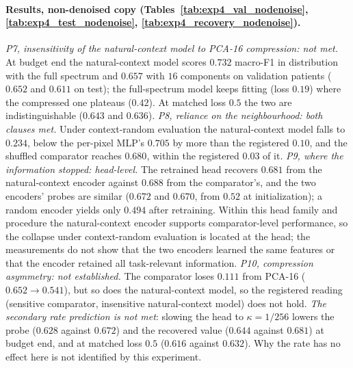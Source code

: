 \paragraph{Results, non-denoised copy (Tables~\ref{tab:exp4_val_nodenoise},
\ref{tab:exp4_test_nodenoise}, \ref{tab:exp4_recovery_nodenoise}).}
\emph{P7, insensitivity of the natural-context model to PCA-16 compression: not
met.} At budget end the natural-context model scores $0.732$ macro-F1 in distribution
with the full spectrum and $0.657$ with $16$ components on validation patients
($0.652$ and $0.611$ on test); the full-spectrum model keeps fitting (loss $0.19$)
where the compressed one plateaus ($0.42$). At matched loss $0.5$ the two are
indistinguishable ($0.643$ and $0.636$). \emph{P8, reliance on the neighbourhood:
both clauses met.} Under context-random evaluation the natural-context model falls to
$0.234$, below the per-pixel MLP's $0.705$ by more than the registered $0.10$, and the
shuffled comparator reaches $0.680$, within the registered $0.03$ of it.
\emph{P9, where the information stopped: head-level.} The retrained head recovers
$0.681$ from the natural-context encoder against $0.688$ from the comparator's, and the
two encoders' probes are similar ($0.672$ and $0.670$, from $0.52$ at initialization);
a random encoder yields only $0.494$ after retraining. Within this head family and
procedure the natural-context encoder supports comparator-level performance, so the
collapse under context-random evaluation is located at the head; the measurements do
not show that the two encoders learned the same features or that the encoder retained
all task-relevant information. \emph{P10,
compression asymmetry: not established.} The comparator loses $0.111$ from PCA-16
($0.652\to0.541$), but so does the natural-context model, so the registered reading
(sensitive comparator, insensitive natural-context model) does not hold. \emph{The
secondary rate prediction is not met}: slowing the head to $\kappa=1/256$ lowers the
probe ($0.628$ against $0.672$) and the recovered value ($0.644$ against $0.681$) at
budget end, and at matched loss $0.5$ ($0.616$ against $0.632$). Why the rate has no
effect here is not identified by this experiment.

